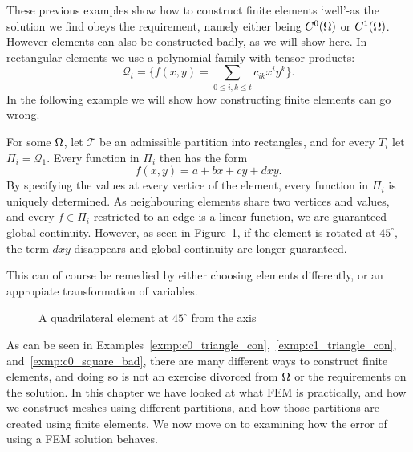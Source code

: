 These previous examples show how to construct finite elements `well'-as 
the solution we find obeys the requirement, namely either being $C^0(\Omega)$ or 
$C^1(\Omega)$. However elements can also be constructed badly, as we will 
show here. In rectangular elements we use a polynomial family with 
tensor products:
\begin{equation*}
    \mathcal{Q}_t = \{ f(x,y)= \sum_{0\leq i,k \leq t} c_{ik}x^i y^k \}.
\end{equation*}
In the following example we will show how constructing finite elements 
can go wrong.
\begin{exmp}{\quad\label{exmp:c0_square_bad}}
   For some $\Omega$, let $\mathcal{T}$ be an admissible partition into 
   rectangles, and for every $T_i$ let $\Pi_i = \mathcal{Q}_1$. 
   Every function in $\Pi_i$ then has the form 
   \begin{equation*}
    f(x,y) = a + bx + cy + dxy.
   \end{equation*}
   By specifying the values at every vertice of the element, every 
   function in $\Pi_i$ is uniquely determined. 
   As neighbouring elements share two vertices and values, and every $f\in\Pi_i$
   restricted to an edge is a linear function, we are guaranteed global 
   continuity. However, 
    as seen in Figure~\ref{fig:quad_element_bad}, if the element is rotated 
   at $45^\circ$, the term $dxy$ disappears and global continuity are longer 
   guaranteed.

   This can of course be remedied by either choosing elements differently, 
   or an appropiate transformation of variables.
\end{exmp}
\begin{figure}[ht]
    \centering
    
    \caption{A quadrilateral element at $45^\circ$ from the axis}\label{fig:quad_element_bad}
\end{figure}
As can be seen in Examples~\ref{exmp:c0_triangle_con},~\ref{exmp:c1_triangle_con}, 
and~\ref{exmp:c0_square_bad}, there are many different ways to construct 
finite elements, and doing so is not an exercise divorced %
from $\Omega$ or 
the requirements on the solution. In this chapter we have looked at what FEM is practically, and how we construct 
meshes using different partitions, and how those partitions are created using 
finite elements. We now move on to examining how the error of using a 
FEM solution behaves.

